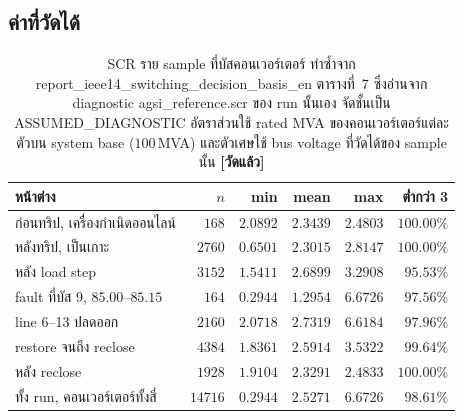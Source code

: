 \documentclass[12pt,a4paper]{article}
\theoremstyle{remark}
\newcommand{\code}[1]{{\ttfamily\small\hyphenchar\font=-1 #1}}
\newcommand{\measured}{\textcolor{ok}{\textbf{[วัดแล้ว]}}}
\begin{document}
\subsection{ค่าที่วัดได้}

\begin{table}[H]
\centering
\small
\begin{tabular}{@{}lrrrrr@{}}
\toprule
\textbf{หน้าต่าง} & $n$ & \textbf{min} & \textbf{mean} & \textbf{max} & \textbf{ต่ำกว่า 3}\\
\midrule
ก่อนทริป, เครื่องกำเนิดออนไลน์ & $168$ & $2.0892$ & $2.3439$ & $2.4803$ & $100.00\%$\\
หลังทริป, เป็นเกาะ      & $2760$ & $0.6501$ & $\mathbf{2.3015}$ & $2.8147$ & $\mathbf{100.00\%}$\\
หลัง load step          & $3152$ & $1.5411$ & $2.6899$ & $3.2908$ & $95.53\%$\\
fault ที่บัส 9, $85.00$--$85.15$ & $164$ & $0.2944$ & $1.2954$ & $6.6726$ & $97.56\%$\\
line 6--13 ปลดออก      & $2160$ & $2.0718$ & $2.7319$ & $6.6184$ & $97.96\%$\\
restore จนถึง reclose   & $4384$ & $1.8361$ & $2.5914$ & $3.5322$ & $99.64\%$\\
หลัง reclose            & $1928$ & $1.9104$ & $2.3291$ & $2.4833$ & $100.00\%$\\
\midrule
ทั้ง run, คอนเวอร์เตอร์ทั้งสี่ & $14716$ & $0.2944$ & $2.5271$ & $6.6726$ & $\mathbf{98.61\%}$\\
\bottomrule
\end{tabular}
\caption{SCR ราย sample ที่บัสคอนเวอร์เตอร์ ทำซ้ำจาก
\code{report\_ieee14\_switching\_decision\_basis\_en} ตารางที่~7 ซึ่งอ่านจาก
diagnostic \code{agsi\_reference.scr} ของ run นั้นเอง จัดชั้นเป็น
\code{ASSUMED\_DIAGNOSTIC} อัตราส่วนใช้ rated MVA ของคอนเวอร์เตอร์แต่ละตัวบน
system base ($100$\,MVA) และตัวเศษใช้ bus voltage ที่วัดได้ของ sample นั้น
\measured}
\label{tab:scr}
\end{table}
\end{document}
